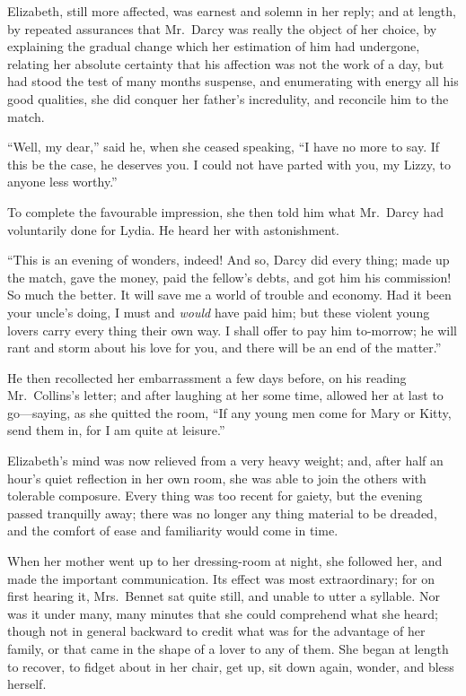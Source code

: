 \documentclass[12pt,english]{book}
\begin{document}
Elizabeth, still more affected, was earnest and solemn in her reply;
and at length, by repeated assurances that Mr.\ Darcy was really
the object of her choice, by explaining the gradual change which her
estimation of him had undergone, relating her absolute certainty that
his affection was not the work of a day, but had stood the test of
many months suspense, and enumerating with energy all his good qualities,
she did conquer her father's incredulity, and reconcile him to the
match.

{}``Well, my dear,'' said he, when she ceased speaking, {}``I have
no more to say. If this be the case, he deserves you. I could not
have parted with you, my Lizzy, to anyone less worthy.''

To complete the favourable impression, she then told him what Mr.\ Darcy
had voluntarily done for Lydia. He heard her with astonishment.

{}``This is an evening of wonders, indeed! And so, Darcy did every
thing; made up the match, gave the money, paid the fellow's debts,
and got him his commission! So much the better. It will save me a
world of trouble and economy. Had it been your uncle's doing, I must
and \textit{would} have paid him; but these violent young lovers carry
every thing their own way. I shall offer to pay him to-morrow; he
will rant and storm about his love for you, and there will be an end
of the matter.''

He then recollected her embarrassment a few days before, on his reading
Mr.\ Collins's letter; and after laughing at her some time, allowed
her at last to go\mbox{---}saying, as she quitted the room, {}``If
any young men come for Mary or Kitty, send them in, for I am quite
at leisure.''

Elizabeth's mind was now relieved from a very heavy weight; and, after
half an hour's quiet reflection in her own room, she was able to join
the others with tolerable composure. Every thing was too recent for
gaiety, but the evening passed tranquilly away; there was no longer
any thing material to be dreaded, and the comfort of ease and familiarity
would come in time.

When her mother went up to her dressing-room at night, she followed
her, and made the important communication. Its effect was most extraordinary;
for on first hearing it, Mrs.\ Bennet sat quite still, and unable
to utter a syllable. Nor was it under many, many minutes that she
could comprehend what she heard; though not in general backward to
credit what was for the advantage of her family, or that came in the
shape of a lover to any of them. She began at length to recover, to
fidget about in her chair, get up, sit down again, wonder, and bless
herself.
\end{document}
